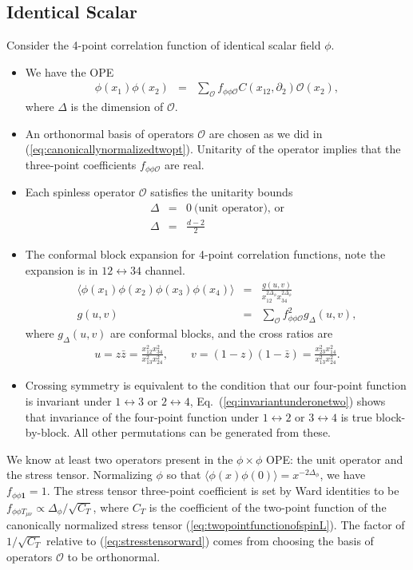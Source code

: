 \documentclass[12pt]{article}
\numberwithin{equation}{section}
\newcommand\be{\begin{eqnarray}}
\newcommand\ee{\end{eqnarray}}
\newcommand\f\phi
\newcommand\cO{\mathcal{O}}
\newcommand\p[1]{\left(#1\right)}
\newcommand\ptl\partial
\newcommand\<\langle
\renewcommand\>\rangle
\newcommand\nn{\nonumber}
\renewcommand\.{\cdot}
\newcommand\x\times
\newcommand\De{\Delta}
\begin{document}
\subsection{Identical Scalar} 
Consider the 4-point correlation function of identical scalar field $\f$.
\begin{itemize}
\item We have the OPE
\be
\f(x_1)\f(x_2) &=& \sum_{\cO} f_{\f\f\cO} C(x_{12},\ptl_2) \cO(x_2),
\ee
where $\De$ is the dimension of $\cO$.

\item An orthonormal basis of operators $\cO$ are chosen as we did in (\ref{eq:canonicallynormalizedtwopt}).  Unitarity of the operator implies that the three-point coefficients $f_{\f\f\cO}$ are real.

\item Each spinless operator $\cO$ satisfies the unitarity bounds
\be
\label{eq:unitarityboundsummary}
\De &=& 0 \ \textrm{(unit operator), or}\nn\\
\De &=& \frac{d-2}{2}
\ee

\item The conformal block expansion for 4-point correlation functions, note the expansion is in $12\leftrightarrow34$ channel.
\be
\<\f(x_1)\f(x_2)\f(x_3)\f(x_4)\> &=& \frac{g(u,v)}{x_{12}^{2\De_\f}x_{34}^{2\De_\f}}\\
g(u,v) &=& \sum_\cO f_{\f\f\cO}^2 g_{\De}(u,v),
\ee
where $g_{\De}(u,v)$ are conformal blocks, and the cross ratios are
\be
u = z\bar z = \frac{x_{12}^2 x_{34}^2}{x_{13}^2 x_{24}^2},\qquad v=(1-z)(1-\bar z) =\frac{x_{23}^2 x_{14}^2}{x_{13}^2 x_{24}^2}.
\ee


\item Crossing symmetry is equivalent to the condition that our four-point function is invariant under $1\leftrightarrow 3$ or $2\leftrightarrow 4$,
Eq.~(\ref{eq:invariantunderonetwo}) shows that invariance of the four-point function under $1\leftrightarrow 2$ or $3\leftrightarrow 4$ is true block-by-block.  All other permutations can be generated from these.

\end{itemize}

We know at least two operators present in the $\f\x\f$ OPE: the unit operator and the stress tensor.  Normalizing $\f$ so that $\<\f(x)\f(0)\>=x^{-2\De_\f}$, we have $f_{\f\f\mathbf{1}}=1$.  The stress tensor three-point coefficient is set by Ward identities to be $f_{\f\f T_{\mu\nu}}\propto \De_\f/\sqrt{C_T}$, where $C_T$ is the coefficient of the two-point function of the canonically normalized stress tensor (\ref{eq:twopointfunctionofspinL}).  The factor of $1/\sqrt{C_T}$ relative to (\ref{eq:stresstensorward}) comes from choosing the basis of operators $\cO$ to be orthonormal.
\end{document}
